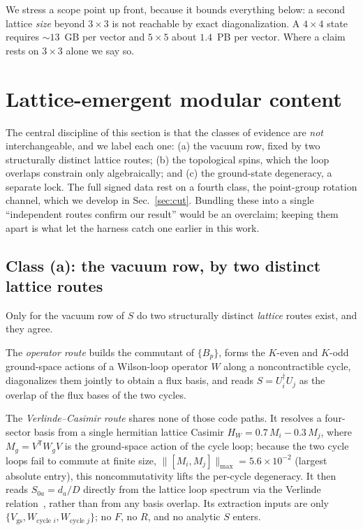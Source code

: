 \documentclass[aps,pra,twocolumn,superscriptaddress,longbibliography,floatfix,nofootinbib]{revtex4-2}
\newcommand{\Maxnorm}[1]{\lVert #1 \rVert_{\max}}
\begin{document}
We stress a scope point up front, because it bounds everything below: a second
lattice \emph{size} beyond $3\times3$ is not reachable by exact
diagonalization. A $4\times4$ state requires ${\sim}13$~GB per vector and
$5\times5$ about $1.4$~PB per vector. Where a claim rests on $3\times3$ alone
we say so.

\section{Lattice-emergent modular content}
\label{sec:c1}

The central discipline of this section is that the classes of evidence are
\emph{not} interchangeable, and we label each one: (a) the vacuum row, fixed by
two structurally distinct lattice routes; (b) the topological spins, which the
loop overlaps constrain only algebraically; and (c) the ground-state
degeneracy, a separate lock. The full signed data rest on a fourth class, the
point-group rotation channel, which we develop in Sec.~\ref{sec:cut}. Bundling
these into a single ``independent routes confirm our result'' would be an
overclaim; keeping them apart is what let the harness catch one earlier in this
work.

\subsection{Class (a): the vacuum row, by two distinct lattice routes}
\label{sec:classa}

Only for the vacuum row of $S$ do two structurally distinct \emph{lattice}
routes exist, and they agree.

The \emph{operator route} builds the commutant of $\{B_p\}$, forms the
$K$-even and $K$-odd ground-space actions of a Wilson-loop operator $W$ along a
noncontractible cycle, diagonalizes them jointly to obtain a flux basis, and
reads $S=U_i^{\dagger}U_j$ as the overlap of the flux bases of the two cycles.

The \emph{Verlinde--Casimir route} shares none of those code paths. It resolves
a four-sector basis from a single hermitian lattice Casimir
$H_W = 0.7\,M_i - 0.3\,M_j$, where $M_g=V^{\mathsf T}W_gV$ is the ground-space
action of the cycle loop; because the two cycle loops fail to commute at finite
size, $\Maxnorm{[M_i,M_j]} = 5.6\times10^{-2}$ (largest absolute entry),
this noncommutativity lifts
the per-cycle degeneracy. It then reads $S_{0a}=d_a/D$ directly from the
lattice loop spectrum via the Verlinde relation~\cite{Verlinde1988}, rather
than from any basis overlap. Its extraction inputs are only
$\{V_{\mathrm{gs}}, W_{\text{cycle }i}, W_{\text{cycle }j}\}$; no $F$, no $R$,
and no analytic $S$ enters.
\end{document}
